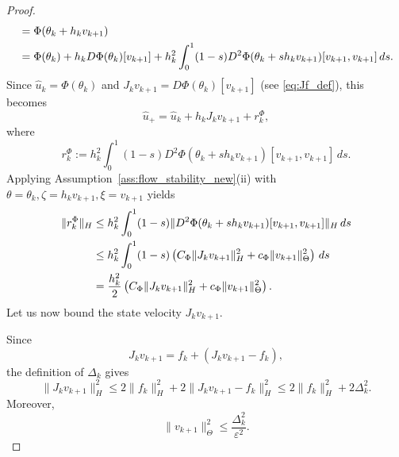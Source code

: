 \documentclass[oneside,11pt]{article}
\theoremstyle{remark}
\theoremstyle{thmstyleone}
\theoremstyle{thmstylethree}
\theoremstyle{thmstyletwo}
\newcommand{\norm}[1]{\lVert #1\rVert}
\newcommand{\tc}[1]{#1}
\begin{document}
\begin{proof}
\begin{align}
     & =
    \Phi(\theta_k+h_kv_{k+1})
    \notag \\
     & =
    \Phi(\theta_k)
    +
    h_kD\Phi(\theta_k)[v_{k+1}]
    +
    h_k^2
    \int_0^1
    (1-s)
    D^2\Phi(\theta_k+s h_kv_{k+1})
    [v_{k+1},v_{k+1}]
    \,ds .
    \label{eq:Phi_taylor_integral_new}
  \end{align}
  Since $\hat u_k=\Phi(\theta_k)$ and
  $J_kv_{k+1}=D\Phi(\theta_k)[v_{k+1}]$ (see \eqref{eq:Jf_def}), this becomes
  \begin{equation}
    \hat u_+
    =
    \hat u_k+h_kJ_kv_{k+1}+r_k^\Phi,
    \label{eq:Phi_taylor_new}
  \end{equation}
  where
  \begin{equation}
    r_k^\Phi
    :=
    h_k^2
    \int_0^1
    (1-s)
    D^2\Phi(\theta_k+s h_kv_{k+1})
    [v_{k+1},v_{k+1}]
    \,ds .
    \label{eq:Phi_remainder_def_new}
  \end{equation}
  Applying Assumption~\ref{ass:flow_stability_new}\textnormal{(ii)}
  with $
    \theta=\theta_k,
    \zeta=h_kv_{k+1},
    \xi=v_{k+1}$
  yields
  \begin{align}
    \norm{r_k^\Phi}_H
     & \le
    h_k^2
    \int_0^1
    (1-s)
    \norm{
    D^2\Phi(\theta_k+s h_kv_{k+1})
    [v_{k+1},v_{k+1}]
    }_H
    \,ds
    \notag \\
     & \le
    h_k^2
    \int_0^1
    (1-s)
    \left(
    C_\Phi\norm{J_kv_{k+1}}_H^2
    +
    c_\Phi\norm{v_{k+1}}_\Theta^2
    \right)
    \,ds
    \notag \\
     & =
    \frac{h_k^2}{2}
    \left(
    C_\Phi\norm{J_kv_{k+1}}_H^2
    +
    c_\Phi\norm{v_{k+1}}_\Theta^2
    \right).
    \label{eq:Phi_remainder_bound_new}
  \end{align}
  Let us now bound the state velocity $J_kv_{k+1}$.
    \tc{
      Since
      \begin{equation}
        J_kv_{k+1}=f_k+(J_kv_{k+1}-f_k),
      \end{equation}
      the definition of $\Delta_k$ gives
      \begin{equation} \label{eq:state_velocity_bound}
        \norm{J_kv_{k+1}}_H^2
        \le
        2\norm{f_k}_H^2
        +
        2\norm{J_kv_{k+1}-f_k}_H^2
        \le
        2\norm{f_k}_H^2
        +
        2\Delta_k^2.
      \end{equation}
      Moreover,
      \begin{equation} \label{eq:velocity_bound}
        \norm{v_{k+1}}_\Theta^2
        \le
        \frac{\Delta_k^2}{\varepsilon^2}.
      \end{equation}
    }


\end{proof}
\end{document}
